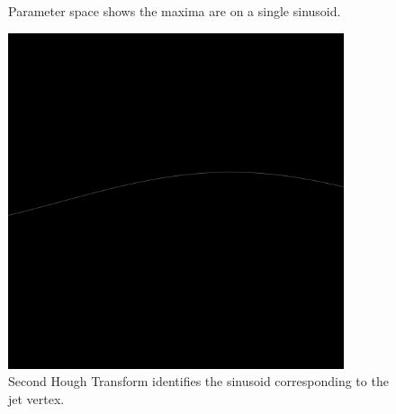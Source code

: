 \documentclass{JINST}
\begin{document}
\begin{figure}[!Hhtb]
\begin{minipage}[t]{4.9cm}
\begin{center}
	\caption{Parameter space shows the maxima are on a single sinusoid.  \label{fig:jet1_accumulator}}
	\end{center}
\end{minipage}
\begin{minipage}[t]{4.9cm}
\begin{center}
	\includegraphics[width=0.88\textwidth]{figs/jet1/vertex.pdf}
	\caption{Second Hough Transform identifies the sinusoid corresponding to the jet vertex.  \label{fig:jet1_vertex}}
	\end{center}
\end{minipage}
\end{figure}
\end{document}
